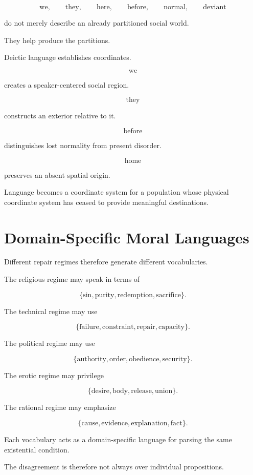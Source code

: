 \documentclass[11pt,oneside]{book}
\theoremstyle{definition}
\theoremstyle{remark}
\begin{document}
\[
\text{we},
\qquad
\text{they},
\qquad
\text{here},
\qquad
\text{before},
\qquad
\text{normal},
\qquad
\text{deviant}
\]

do not merely describe an already partitioned social world.

They help produce the partitions.

Deictic language establishes coordinates.

\[
\text{we}
\]

creates a speaker-centered social region.

\[
\text{they}
\]

constructs an exterior relative to it.

\[
\text{before}
\]

distinguishes lost normality from present disorder.

\[
\text{home}
\]

preserves an absent spatial origin.

Language becomes a coordinate system for a population whose physical coordinate system has ceased to provide meaningful destinations.

\section{Domain-Specific Moral Languages}

Different repair regimes therefore generate different vocabularies.

The religious regime may speak in terms of

\[
\{\text{sin},\text{purity},\text{redemption},\text{sacrifice}\}.
\]

The technical regime may use

\[
\{\text{failure},\text{constraint},\text{repair},\text{capacity}\}.
\]

The political regime may use

\[
\{\text{authority},\text{order},\text{obedience},\text{security}\}.
\]

The erotic regime may privilege

\[
\{\text{desire},\text{body},\text{release},\text{union}\}.
\]

The rational regime may emphasize

\[
\{\text{cause},\text{evidence},\text{explanation},\text{fact}\}.
\]

Each vocabulary acts as a domain-specific language for parsing the same existential condition.

The disagreement is therefore not always over individual propositions.
\end{document}
